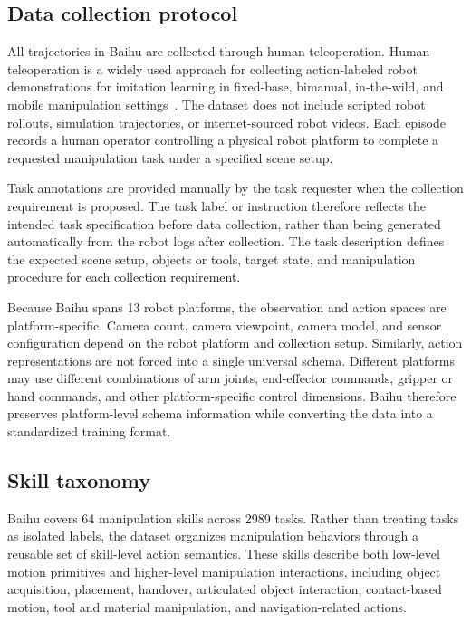 \subsection{Data collection protocol}

All trajectories in Baihu are collected through human teleoperation. Human teleoperation is a widely used approach for collecting action-labeled robot demonstrations for imitation learning in fixed-base, bimanual, in-the-wild, and mobile manipulation settings~\cite{mandlekar2018roboturk,sharma2018mime,zhao2023aloha,fu2024mobilealoha,khazatsky2024droid}. The dataset does not include scripted robot rollouts, simulation trajectories, or internet-sourced robot videos. Each episode records a human operator controlling a physical robot platform to complete a requested manipulation task under a specified scene setup.

Task annotations are provided manually by the task requester when the collection requirement is proposed. The task label or instruction therefore reflects the intended task specification before data collection, rather than being generated automatically from the robot logs after collection. The task description defines the expected scene setup, objects or tools, target state, and manipulation procedure for each collection requirement.

Because Baihu spans 13 robot platforms, the observation and action spaces are platform-specific. Camera count, camera viewpoint, camera model, and sensor configuration depend on the robot platform and collection setup. Similarly, action representations are not forced into a single universal schema. Different platforms may use different combinations of arm joints, end-effector commands, gripper or hand commands, and other platform-specific control dimensions. Baihu therefore preserves platform-level schema information while converting the data into a standardized training format.

\subsection{Skill taxonomy}

Baihu covers 64 manipulation skills across 2989 tasks. Rather than treating tasks as isolated labels, the dataset organizes manipulation behaviors through a reusable set of skill-level action semantics. These skills describe both low-level motion primitives and higher-level manipulation interactions, including object acquisition, placement, handover, articulated object interaction, contact-based motion, tool and material manipulation, and navigation-related actions.

